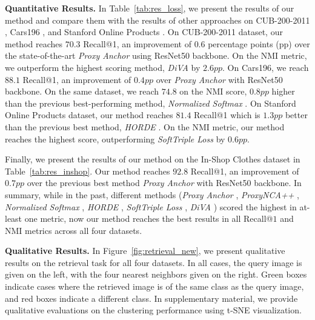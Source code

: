 \documentclass{article}
\begin{document}
\noindent\textbf{Quantitative Results.}
In Table~\ref{tab:res_loss}, we present the results of our method and compare
them with the results of other approaches on CUB-200-2011 \cite{WahCUB_200_2011}, Cars196 \cite{KrauseStarkDengFei-Fei_3DRR2013}, and Stanford Online Products \cite{DBLP:conf/cvpr/SongXJS16}. 
On CUB-200-2011 dataset, our method reaches $70.3$ Recall@1, an improvement of $0.6$ percentage points (pp) over the state-of-the-art \textit{Proxy Anchor} \cite{DBLP:conf/cvpr/KimKCK20} using ResNet50 backbone. On the NMI metric, we outperform the highest scoring method, \textit{DiVA} \cite{DBLP:conf/eccv/MilbichRBSBOC20} by $2.6pp$. On Cars196, we reach $88.1$ Recall@1, an improvement of $0.4pp$ over \textit{Proxy Anchor} \cite{DBLP:conf/cvpr/KimKCK20} with ResNet50 backbone. On the same dataset, we reach $74.8$ on the NMI score, $0.8pp$ higher than the previous best-performing method, \textit{Normalized Softmax} \cite{DBLP:journals/corr/abs-1811-12649}. On Stanford Online Products dataset, our method reaches $81.4$ Recall@1 which is $1.3pp$ better than the previous best method, \textit{HORDE} \cite{DBLP:journals/corr/abs-1908-02735}. On the NMI metric, our method reaches the highest score, outperforming \textit{SoftTriple Loss} \cite{DBLP:journals/corr/abs-1909-05235} by $0.6pp$. 

Finally, we present the results of our method on the In-Shop Clothes dataset in Table~\ref{tab:res_inshop}. Our method reaches $92.8$ Recall@1, an improvement of $0.7pp$ over the previous best method \textit{Proxy Anchor} \cite{DBLP:conf/cvpr/KimKCK20} with ResNet50 backbone. In summary, while in the past, different methods (\textit{Proxy Anchor} \cite{DBLP:conf/cvpr/KimKCK20}, \textit{ProxyNCA++} \cite{DBLP:journals/corr/abs-2004-01113}, \textit{Normalized Softmax} \cite{DBLP:journals/corr/abs-1811-12649}, \textit{HORDE} \cite{DBLP:journals/corr/abs-1908-02735}, \textit{SoftTriple Loss} \cite{DBLP:journals/corr/abs-1909-05235}, \textit{DiVA} \cite{DBLP:conf/eccv/MilbichRBSBOC20}) scored the highest in at-least one metric, now our method reaches the best results in all Recall@$1$ and NMI metrics across all four datasets. 

\noindent\textbf{Qualitative Results.}
In Figure~\ref{fig:retrieval_new}, we present qualitative results on the retrieval task for all four datasets. In all cases, the query image is given on the left, with the four nearest neighbors given on the right. Green boxes indicate cases where the retrieved image is of the same class as the query image, and red boxes indicate a different class. In supplementary material, we provide qualitative evaluations on the clustering performance using t-SNE \cite{DBLP:journals/ml/MaatenH12} visualization.
\end{document}
